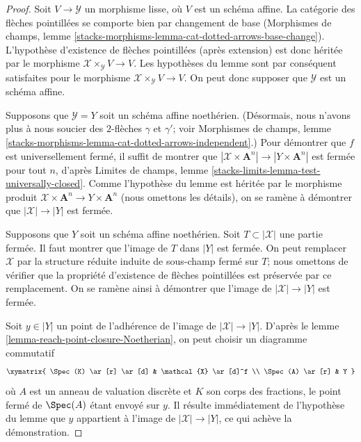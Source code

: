 \begin{proof}
Soit $V \to \mathcal{Y}$ un morphisme lisse, où $V$ est un schéma affine.
La catégorie des flèches pointillées se comporte bien par changement de base
(Morphismes de champs, lemme
\ref{stacks-morphisms-lemma-cat-dotted-arrows-base-change}).
L'hypothèse d'existence de flèches pointillées (après extension)
est donc héritée par le morphisme $\mathcal{X} \times_\mathcal{Y} V \to V$.
Les hypothèses du lemme sont par conséquent satisfaites pour le morphisme
$\mathcal{X} \times_\mathcal{Y} V \to V$.
On peut donc supposer que $\mathcal{Y}$ est un schéma affine.

\medskip\noindent
Supposons que $\mathcal{Y} = Y$ soit un schéma affine noethérien.
(Désormais, nous n'avons plus à nous soucier des
$2$-flèches $\gamma$ et $\gamma'$; voir Morphismes de champs, lemme
\ref{stacks-morphisms-lemma-cat-dotted-arrows-independent}.)
Pour démontrer que $f$ est universellement fermé, il suffit de montrer que
$|\mathcal{X} \times \mathbf{A}^n| \to |Y \times \mathbf{A}^n|$ est fermée
pour tout $n$, d'après Limites de champs, lemme
\ref{stacks-limits-lemma-test-universally-closed}. Comme l'hypothèse
du lemme est héritée par le morphisme produit
$\mathcal{X} \times \mathbf{A}^n \to Y \times \mathbf{A}^n$ (nous omettons les détails),
on se ramène à démontrer que $|\mathcal{X}| \to |Y|$ est fermée.

\medskip\noindent
Supposons que $Y$ soit un schéma affine noethérien.
Soit $T \subset |\mathcal{X}|$ une partie fermée. Il faut montrer que
l'image de $T$ dans $|Y|$ est fermée. On peut remplacer $\mathcal{X}$
par la structure réduite induite de sous-champ fermé sur $T$; nous
omettons de vérifier que la propriété d'existence de
flèches pointillées est préservée par ce remplacement.
On se ramène ainsi à démontrer que l'image
de $|\mathcal{X}| \to |Y|$ est fermée.

\medskip\noindent
Soit $y \in |Y|$ un point de l'adhérence de l'image de
$|\mathcal{X}| \to |Y|$. D'après le lemme \ref{lemma-reach-point-closure-Noetherian},
on peut choisir un diagramme commutatif
$$
\xymatrix{
\Spec(K) \ar[r] \ar[d] & \mathcal{X} \ar[d]^f \\
\Spec(A) \ar[r] & Y
}
$$
où $A$ est un anneau de valuation discrète et $K$ son corps des fractions,
le point fermé de $\Spec(A)$ étant envoyé sur $y$. Il résulte immédiatement
de l'hypothèse du lemme que $y$ appartient à l'image de
$|\mathcal{X}| \to |Y|$, ce qui achève la démonstration.
\end{proof}











